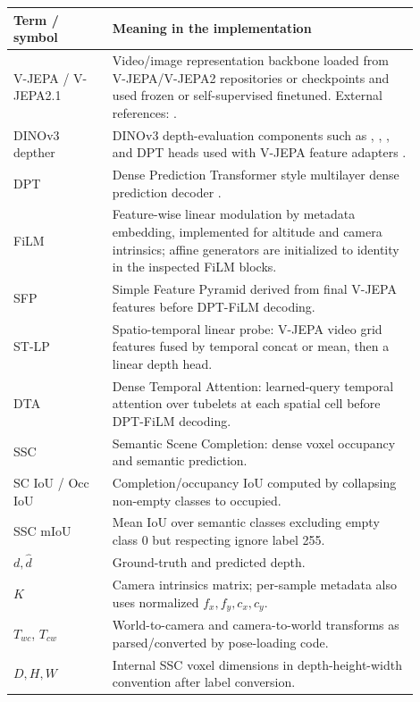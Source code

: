 \documentclass[11pt]{article}
\newcommand{\term}[1]{\textbf{#1}}
\begin{document}
\begin{longtable}{L{0.22\linewidth} L{0.68\linewidth}}
\toprule
\term{Term / symbol} & \term{Meaning in the implementation} \\
\midrule
\endhead
V-JEPA / V-JEPA2.1 & Video/image representation backbone loaded from V-JEPA/V-JEPA2 repositories or checkpoints and used frozen or self-supervised finetuned. External references: \cite{vjepa2024,vjepa22025}. \\
DINOv3 depther & DINOv3 depth-evaluation components such as , , , and DPT heads used with V-JEPA feature adapters \cite{dinov32025,dinov3github}. \\
DPT & Dense Prediction Transformer style multilayer dense prediction decoder \cite{dpt2021}. \\
FiLM & Feature-wise linear modulation by metadata embedding, implemented for altitude and camera intrinsics; affine generators are initialized to identity in the inspected FiLM blocks. \\
SFP & Simple Feature Pyramid derived from final V-JEPA features before DPT-FiLM decoding. \\
ST-LP & Spatio-temporal linear probe: V-JEPA video grid features fused by temporal concat or mean, then a linear depth head. \\
DTA & Dense Temporal Attention: learned-query temporal attention over tubelets at each spatial cell before DPT-FiLM decoding. \\
SSC & Semantic Scene Completion: dense voxel occupancy and semantic prediction. \\
SC IoU / Occ IoU & Completion/occupancy IoU computed by collapsing non-empty classes to occupied. \\
SSC mIoU & Mean IoU over semantic classes excluding empty class 0 but respecting ignore label 255. \\
\(d,\hat d\) & Ground-truth and predicted depth. \\
\(K\) & Camera intrinsics matrix; per-sample metadata also uses normalized \(f_x,f_y,c_x,c_y\). \\
\(T_{wc}\), \(T_{cw}\) & World-to-camera and camera-to-world transforms as parsed/converted by pose-loading code. \\
\(D,H,W\) & Internal SSC voxel dimensions in depth-height-width convention after label conversion. \\
\bottomrule
\end{longtable}
\end{document}
